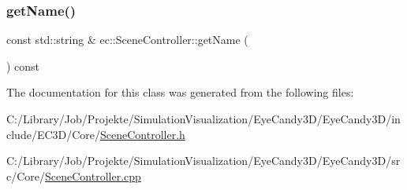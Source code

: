 \subsubsection{\texorpdfstring{get\+Name()}{getName()}}
{\footnotesize\ttfamily const std\+::string \& ec\+::\+Scene\+Controller\+::get\+Name (\begin{DoxyParamCaption}{ }\end{DoxyParamCaption}) const}



The documentation for this class was generated from the following files\+:\begin{DoxyCompactItemize}
\item 
C\+:/\+Library/\+Job/\+Projekte/\+Simulation\+Visualization/\+Eye\+Candy3\+D/\+Eye\+Candy3\+D/include/\+E\+C3\+D/\+Core/\mbox{\hyperlink{_scene_controller_8h}{Scene\+Controller.\+h}}\item 
C\+:/\+Library/\+Job/\+Projekte/\+Simulation\+Visualization/\+Eye\+Candy3\+D/\+Eye\+Candy3\+D/src/\+Core/\mbox{\hyperlink{_scene_controller_8cpp}{Scene\+Controller.\+cpp}}\end{DoxyCompactItemize}
